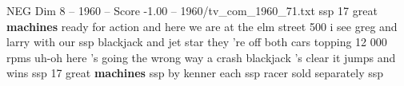 \begin{textsample}{NEG Dim 8 – 1960 – Score -1.00 – 1960/tv\_com\_1960\_71.txt}  \label{ex:f8_neg_035}
ssp 17 great \textbf{machines} ready for action and here we are at the elm street 500 i see greg and larry with our ssp blackjack and jet star they 're off both cars topping 12 000 rpms uh-oh here 's going the wrong way a crash blackjack 's clear it jumps and wins ssp 17 great \textbf{machines} ssp by kenner each ssp racer sold separately ssp

\end{textsample}
